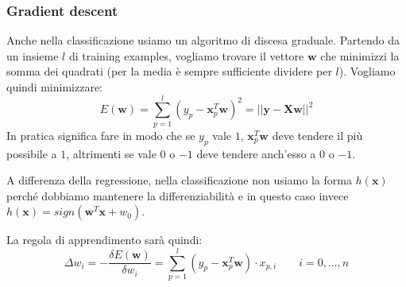 \subsubsection{Gradient descent}
Anche nella classificazione usiamo un algoritmo di discesa graduale. Partendo da un insieme $l$ di training examples, vogliamo trovare il vettore $\mathbf{w}$ che minimizzi la somma dei quadrati (per la media è sempre sufficiente dividere per $l$). Vogliamo quindi minimizzare:
\begin{equation}
	E(\mathbf{w}) = \sum_{p=1}^{l}(y_p-\mathbf{x}_p^T\mathbf{w})^2 = \lvert\lvert \mathbf{y} - \mathbf{Xw}\rvert\rvert^2
\end{equation}
In pratica significa fare in modo che se $y_p$ vale $1$, $\mathbf{x}_p^T\mathbf{w}$ deve tendere il più possibile a $1$, altrimenti se vale $0$ o $-1$ deve tendere anch'esso a $0$ o $-1$.

\begin{observation}
	A differenza della regressione, nella classificazione non usiamo la forma $h(\mathbf{x})$ perché dobbiamo mantenere la differenziabilità e in questo caso invece $h(\mathbf{x})=sign(\mathbf{w}^T\mathbf{x} + w_0)$. 
\end{observation}

La regola di apprendimento sarà quindi:
\begin{equation}
	\Delta w_i = -\frac{\delta E(\mathbf{w})}{\delta w_i} = \sum_{p=1}^{l}(y_p - \mathbf{x}_p^T \mathbf{w}) \cdot x_{p,i} \quad\quad i=0,\ldots,n
\end{equation}

